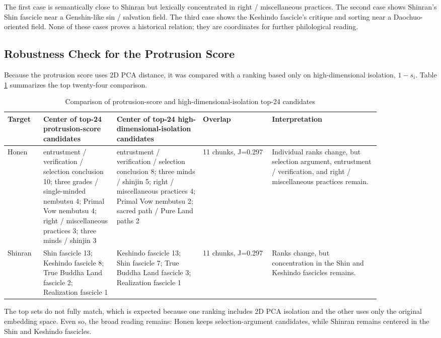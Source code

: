\documentclass[uplatex,dvipdfmx,11pt,a4paper]{jsarticle}
\begin{document}
The first case is semantically close to Shinran but lexically concentrated in right / miscellaneous practices. The second case shows Shinran's Shin fascicle near a Genshin-like sin / salvation field. The third case shows the Keshindo fascicle's critique and sorting near a Daochuo-oriented field. None of these cases proves a historical relation; they are coordinates for further philological reading.

\subsection{Robustness Check for the Protrusion Score}

Because the protrusion score uses 2D PCA distance, it was compared with a ranking based only on high-dimensional isolation, \(1 - s_{i}\). Table \ref{tab:high-dim-isolation-check} summarizes the top twenty-four comparison.

\begin{table}[H]
\centering
\footnotesize
\setlength{\tabcolsep}{2pt}
\caption{Comparison of protrusion-score and high-dimensional-isolation top-24 candidates}
\label{tab:high-dim-isolation-check}
\begin{tabular}{@{}p{0.08\linewidth}p{0.17\linewidth}p{0.20\linewidth}p{0.16\linewidth}p{0.25\linewidth}@{}}
\toprule
Target & Center of top-24 protrusion-score candidates & Center of top-24 high-dimensional-isolation candidates & Overlap & Interpretation \\
\midrule
Honen & entrustment / verification / selection conclusion 10; three grades / single-minded nembutsu 4; Primal Vow nembutsu 4; right / miscellaneous practices 3; three minds / shinjin 3 & entrustment / verification / selection conclusion 8; three minds / shinjin 5; right / miscellaneous practices 4; Primal Vow nembutsu 2; sacred path / Pure Land paths 2 & 11 chunks, J=0.297 & Individual ranks change, but selection argument, entrustment / verification, and right / miscellaneous practices remain. \\
Shinran & Shin fascicle 13; Keshindo fascicle 8; True Buddha Land fascicle 2; Realization fascicle 1 & Keshindo fascicle 13; Shin fascicle 7; True Buddha Land fascicle 3; Realization fascicle 1 & 11 chunks, J=0.297 & Ranks change, but concentration in the Shin and Keshindo fascicles remains. \\
\bottomrule
\end{tabular}
\end{table}

The top sets do not fully match, which is expected because one ranking includes 2D PCA isolation and the other uses only the original embedding space. Even so, the broad reading remains: Honen keeps selection-argument candidates, while Shinran remains centered in the Shin and Keshindo fascicles.
\end{document}
